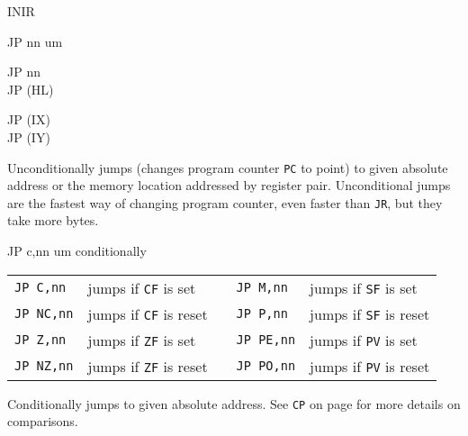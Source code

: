 \documentclass[12pt,twoside,openright,a4paper]{book}
\begin{document}
\begin{basedescript}{
	\desclabelstyle{\multilinelabel}
	\desclabelwidth{3cm}}
\begin{DetailItem}{INIR}
	\end{DetailItem}

	\pagebreak
	\begin{DetailItem}{JP nn}
		{um}
		{}

		\begin{DetailVariants}
			JP nn\\
			JP (HL)
			
			\columnbreak
			JP (IX)\\
			JP (IY)
		\end{DetailVariants}

		Unconditionally jumps (changes program counter {\tt PC} to point) to given absolute address or the memory location addressed by register pair. Unconditional jumps are the fastest way of changing program counter, even faster than {\tt JR}, but they take more bytes.

		\begin{DetailEffects}
			\FlagsJPnn
		\end{DetailEffects}
				
		\begin{DetailTiming}
		\end{DetailTiming}

	\end{DetailItem}

	\begin{DetailItem}{JP c,nn}
		{um conditionally}
		{}

		\vspace{1ex} %
		\begin{tabular}{@{}llcll}			
			{\tt JP C,nn} & jumps if {\tt CF} is set & &
				{\tt JP M,nn} & jumps if {\tt SF} is set\\

			{\tt JP NC,nn} & jumps if {\tt CF} is reset & &
				{\tt JP P,nn} & jumps if {\tt SF} is reset\\

			{\tt JP Z,nn} & jumps if {\tt ZF} is set & &
				{\tt JP PE,nn} & jumps if {\tt PV} is set\\

			{\tt JP NZ,nn} & jumps if {\tt ZF} is reset & &
				{\tt JP PO,nn} & jumps if {\tt PV} is reset\\
		\end{tabular}

		Conditionally jumps to given absolute address. See {\tt CP} on page \pageref{DetailRefCP} for more details on comparisons.


\end{DetailItem}
\end{basedescript}
\end{document}
